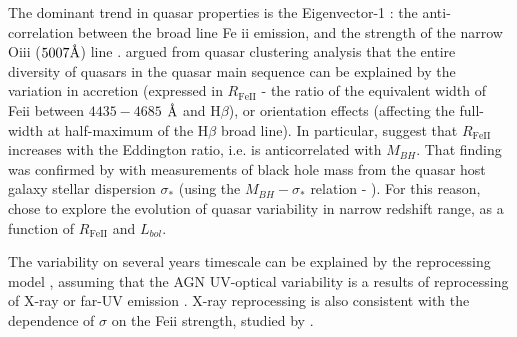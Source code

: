 \documentclass[twocolumn]{aastex62}
\let\oldAA\AA
\renewcommand{\AA}{\text{\normalfont\oldAA}}
\begin{document}
The dominant trend in quasar properties is the Eigenvector-1 : the anti-correlation between the broad line Fe {\sc ii} emission, and the strength of the narrow O{\sc iii} ($5007 \mbox{\AA}$) line \citep{wang1996}. \citet{shen2014} argued from quasar clustering analysis that the entire diversity of quasars in  the quasar main sequence can be explained by the variation in accretion (expressed in $R_{\mathrm{Fe  II}}$ - the ratio of the equivalent width of   Fe{\sc ii}  between $4435-4685$ $\mbox{\AA}$ and H$\beta$), or orientation effects (affecting the full-width at half-maximum of the H$\beta$ broad line). In particular, \citet{shen2014} suggest that $R_{\mathrm{Fe  II}}$ increases with  the Eddington ratio, i.e. is anticorrelated with $M_{BH}$. That finding was confirmed by \cite{sun2015} with measurements of black hole mass from the quasar host galaxy stellar dispersion $\sigma_{*}$ (using the $M_{BH} - \sigma_{*}$ relation - \citealt{ferrarese2000, kormendy2013}). For this reason,  \citet{sun2018} chose to explore the evolution of quasar variability in narrow redshift range, as a function of  $R_{\mathrm{Fe  II}}$ and $L_{bol}$. 

The variability on several years timescale can be explained by the reprocessing model \cite{kokubo2015}, assuming that the AGN UV-optical variability is a results of reprocessing of X-ray or far-UV emission \citep{krolik1991}.  X-ray reprocessing is also consistent with  the dependence of $\hat{\sigma}$ on the Fe{\sc ii} strength, studied by \citep{sun2018}. 


\end{document}
